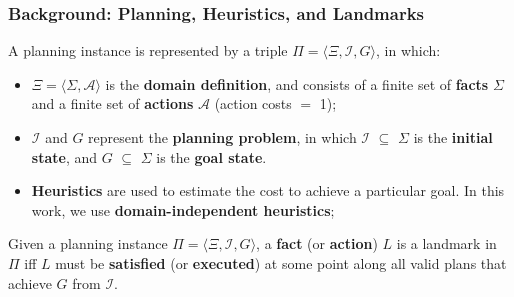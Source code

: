\documentclass{beamer}
\begin{document}

\begin{frame}[c]\frametitle{Background: Planning, Heuristics, and Landmarks}
	\vspace{-2mm}
	\begin{definition}[Planning]
		A planning instance is represented by a triple $\Pi = \langle \Xi, \mathcal{I}, G\rangle$, in which:
		\begin{itemize}
			\item $\Xi= \langle \Sigma, \mathcal{A}\rangle$ is the \textbf{domain definition}, and consists of a finite set of \textbf{facts} $\Sigma$ and a finite set of \textbf{actions} $\mathcal{A}$ (action costs $=$ 1);
			\item $\mathcal{I}$ and $G$ represent the \textbf{planning problem}, in which $\mathcal{I}$ $\subseteq$ $\Sigma$ is the \textbf{initial state}, and $G$ $\subseteq$ $\Sigma$ is the \textbf{goal state}.
		\end{itemize}
	\end{definition}
	\vspace{-3mm}
	\begin{itemize}
		\item \textbf{Heuristics} are used to estimate the cost to achieve a particular goal. In this work, we use \textbf{domain-independent heuristics};
	\end{itemize}
	\vspace{-3mm}
	\begin{definition}[Landmarks]
		Given a planning instance $\Pi = \langle \Xi, \mathcal{I}, G\rangle$, a \textbf{fact} (or \textbf{action}) $L$ is a landmark in $\Pi$ iff $L$ 	must be \textbf{satisfied} (or \textbf{executed}) at some point along all valid plans that achieve $G$ from $\mathcal{I}$.
	\end{definition}
\end{frame}

\end{document}
